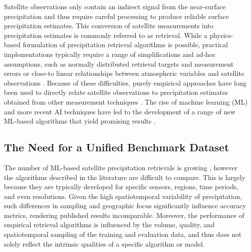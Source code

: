 \documentclass[11pt]{article}
\begin{document}
Satellite observations only contain an indirect signal from the near-surface
precipitation and thus require careful processing to produce reliable surface
precipitation estimates. This conversion of satellite measurements into
precipitation estimates is commonly referred to as retrieval. While a
physics-based formulation of precipitation retrieval algorithms is possible,
practical implementations typically require a range of simplifications and
ad-hoc assumptions, such as normally distributed retrieval targets and
measurement errors or close-to linear relationships between atmospheric
variables and satellite observations \citep{Boukabara2011MiRS,
  Kummerow2015GPROF, Maahn2020OptimalEstimation}. Because of these difficulties,
purely empirical approaches have long been used to directly relate satellite
observations to precipitation estimates obtained from other measurement
techniques \citep{ Griffith1978, Adler1988InfraredRainfall,
  Hong2004Precipitation}. The rise of machine learning (ML) and more recent AI
techniques have led to the development of a range of new ML-based
algorithms that yield promising results \citep{Sadeghi2019Persiann,
  Pfreundschuh2022BrazilRetrieval, Pfreundschuh2022Gprof, Gorooh2023LEOGEO}.


\subsection{The Need for a Unified Benchmark Dataset}

The number of ML-based satellite precipitation retrievals is
growing \citep{Sano2018PNPR, Amell2025Probabilistic}, however the algorithms
described in the literature are difficult to compare. This is largely because
they are typically developed for specific sensors, regions, time periods, and
even resolutions. Given the high spatiotemporal variability of precipitation,
such differences in sampling and geographic focus significantly influence
accuracy metrics, rendering published results incomparable. Moreover, the
performance of empirical retrieval algorithms is influenced by the volume,
quality, and spatiotemporal sampling of the training and evaluation data, and
thus does not solely reflect the intrinsic qualities of a specific algorithm or
model.
\end{document}
